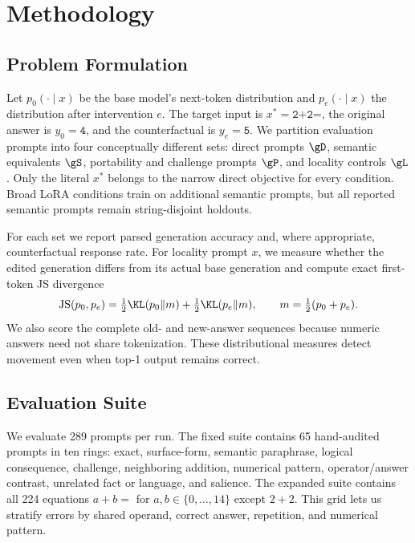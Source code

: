 \section{Methodology}
\label{sec:method}

\subsection{Problem Formulation}

Let $p_0(\cdot\mid x)$ be the base model's next-token distribution and $p_e(\cdot\mid x)$ the distribution after intervention $e$. The target input is $x^*=\texttt{2+2=}$, the original answer is $y_0=\texttt{4}$, and the counterfactual is $y_e=\texttt{5}$. We partition evaluation prompts into four conceptually different sets: direct prompts $\gD$, semantic equivalents $\gS$, portability and challenge prompts $\gP$, and locality controls $\gL$. Only the literal $x^*$ belongs to the narrow direct objective for every condition. Broad LoRA conditions train on additional semantic prompts, but all reported semantic prompts remain string-disjoint holdouts.

For each set we report parsed generation accuracy and, where appropriate, counterfactual response rate. For locality prompt $x$, we measure whether the edited generation differs from its actual base generation and compute exact first-token JS divergence
\begin{equation}
  \js(p_0,p_e)=\tfrac{1}{2}\KL(p_0\|m)+\tfrac{1}{2}\KL(p_e\|m),
  \qquad m=\tfrac{1}{2}(p_0+p_e).
  \label{eq:js}
\end{equation}
We also score the complete old- and new-answer sequences because numeric answers need not share tokenization. These distributional measures detect movement even when top-1 output remains correct.

\subsection{Evaluation Suite}

We evaluate 289 prompts per run. The fixed suite contains 65 hand-audited prompts in ten rings: exact, surface-form, semantic paraphrase, logical consequence, challenge, neighboring addition, numerical pattern, operator/answer contrast, unrelated fact or language, and salience. The expanded suite contains all 224 equations $a+b=$ for $a,b\in\{0,\ldots,14\}$ except $2+2$. This grid lets us stratify errors by shared operand, correct answer, repetition, and numerical pattern.

